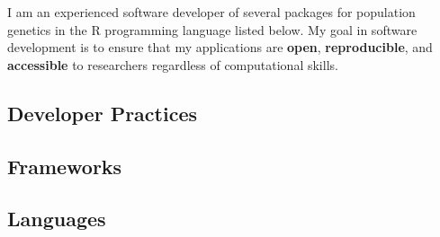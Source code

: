 
I am an experienced software developer of several packages for population
genetics in the R programming language listed below. My goal in software
development is to ensure that my applications are \textbf{open},
\textbf{reproducible}, and \textbf{accessible} to researchers regardless of
computational skills.



\subsection{Developer Practices}


\subsection{Frameworks}


\subsection{Languages}

